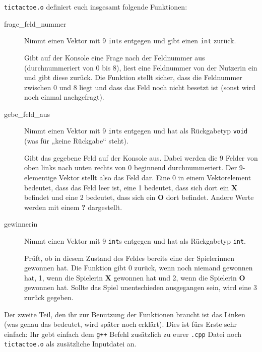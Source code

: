 \texttt{tictactoe.o} definiert euch insgesamt folgende Funktionen:
\begin{description}
	\item[frage\_feld\_nummer]
	      Nimmt einen Vektor mit 9 \texttt{int}s entgegen und gibt einen \texttt{int} zurück.

	      Gibt auf der Konsole eine Frage nach der Feldnummer aus (durchnummeriert von 0 bis 8), liest eine Feldnummer von der Nutzerin ein und gibt diese zurück.
	      Die Funktion stellt sicher, dass die Feldnummer zwischen 0 und 8 liegt und dass das Feld noch nicht besetzt ist (sonst wird noch einmal nachgefragt).
	\item[gebe\_feld\_aus]
	      Nimmt einen Vektor mit 9 \texttt{int}s entgegen und hat als Rückgabetyp \texttt{void} (was für „keine Rückgabe“ steht).

	      Gibt das gegebene Feld auf der Konsole aus. Dabei werden die 9 Felder von oben links nach unten rechts von 0 beginnend durchnummeriert.
	      Der 9-elementige Vektor stellt also das Feld dar.
	      Eine 0 in einem Vektorelement bedeutet, dass das Feld leer ist, eine 1 bedeutet, dass sich dort ein \textbf{X} befindet und eine 2 bedeutet, dass sich ein \textbf{O} dort befindet.
	      Andere Werte werden mit einem \textbf{?} dargestellt.
	\item[gewinnerin]
	      Nimmt einen Vektor mit 9 \texttt{int}s entgegen und hat als Rückgabetyp \texttt{int}.

	      Prüft, ob in diesem Zustand des Feldes bereits eine der Spielerinnen gewonnen hat.
	      Die Funktion gibt 0 zurück, wenn noch niemand gewonnen hat, 1, wenn die Spielerin \textbf{X} gewonnen hat und 2, wenn die Spielerin \textbf{O} gewonnen hat.
	      Sollte das Spiel unentschieden ausgegangen sein, wird eine 3 zurück gegeben.
\end{description}

Der zweite Teil, den ihr zur Benutzung der Funktionen braucht ist das Linken (was genau das bedeutet, wird später noch erklärt).
Dies ist fürs Erste sehr einfach: Ihr gebt einfach dem \texttt{g++} Befehl zusätzlich zu eurer \texttt{.cpp} Datei noch \texttt{tictactoe.o} als zusätzliche Inputdatei an.


